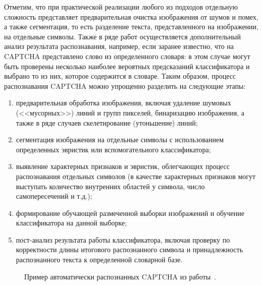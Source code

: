 \documentclass[a4paper,12pt,russian]{article} %
\begin{document}
Отметим, что при практической реализации любого из подходов отдельную сложность представляет предварительная очистка изображения от шумов и помех, а также сегментация, то есть разделение текста, представленного на изображении, на отдельные символы.
Также в ряде работ осуществляется дополнительный анализ результата распознавания, например, если заранее известно, что на CAPTCHA представлено слово из определенного словаря: в этом случае могут быть проверены несколько наиболее вероятных предсказаний классификатора и выбрано то из них, которое содержится в словаре. 
Таким образом, процесс распознавания CAPTCHA можно упрощенно разделить на следующие этапы:
\begin{enumerate}
	\item предварительная обработка изображения, включая удаление шумовых (<<мусорных>>) линий и групп пикселей, бинаризацию изображения, а также в ряде случаев скелетирование (утоньшение) линий;
	\item сегментация изображения на отдельные символы с использованием определенных эвристик или вспомогательного классификатора;
	\item выявление характерных признаков и эвристик, облегчающих процесс распознавания отдельных символов (в качестве характерных признаков могут выступать количество внутренних областей у символа, число самопересечений и т.д.);
	\item формирование обучающей размеченной выборки изображений и обучение классификатора на данной выборке;
	\item пост-анализ результата работы классификатора, включая проверку по корректности длины итогового распознанного символа и принадлежность распознанного текста к определенной словарной базе.
\end{enumerate}

\begin{figure}[t!]
	\caption{
		Пример автоматически распознанных CAPTCHA из работы~\cite{an2017captcha}.
        }
        \label{fig:rev1}
\end{figure}
\end{document}
